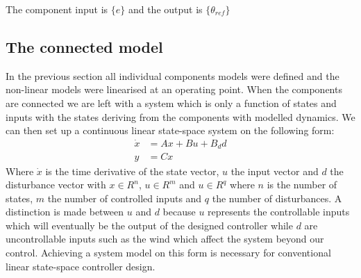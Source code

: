 The component input is $ \{e \} $ and the output is $ \{\theta_{ref} \} $


%
%


\subsection{The connected model} \label{sec:comp_connected}
In the previous section all individual components models were defined and the non-linear models were linearised at an operating point. When the components are connected we are left with a system which is only a function of states and inputs with the states deriving from the components with modelled dynamics. We can then set up a continuous linear state-space system on the following form:
\begin{equation}\label{eq:state-space-sys}
	\begin{split}
		\dot x &= A x + B u + B_d d \\
		y &= Cx
	\end{split}
\end{equation}
Where $ \dot x $ is the time derivative of the state vector, $ u $ the input vector and $ d $ the disturbance vector with $ x \in R^n $, $ u \in R^m $ and $ u \in R^q $ where $ n $ is the number of states, $ m $ the number of controlled inputs and $ q $ the number of disturbances. A distinction is made between $ u $ and $ d $ because $ u $ represents the controllable inputs which will eventually be the output of the designed controller while $ d $ are uncontrollable inputs such as the wind which affect the system beyond our control. Achieving a system model on this form is necessary for conventional linear state-space controller design.

